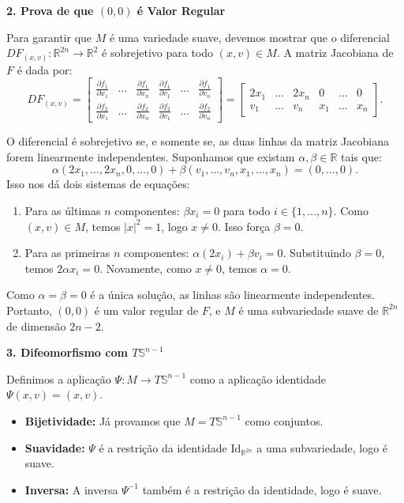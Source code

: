 {	\textbf{2. Prova de que $(0,0)$ é Valor Regular}
	
	Para garantir que $M$ é uma variedade suave, devemos mostrar que o diferencial $DF_{(x,v)} : \mathbb{R}^{2n} \to \mathbb{R}^2$ é sobrejetivo para todo $(x, v) \in M$. A matriz Jacobiana de $F$ é dada por:
	\begin{equation*}
		DF_{(x,v)} = \begin{bmatrix} 
			\frac{\partial f_1}{\partial x_1} & \dots & \frac{\partial f_1}{\partial x_n} & \frac{\partial f_1}{\partial v_1} & \dots & \frac{\partial f_1}{\partial v_n} \\
			\frac{\partial f_2}{\partial x_1} & \dots & \frac{\partial f_2}{\partial x_n} & \frac{\partial f_2}{\partial v_1} & \dots & \frac{\partial f_2}{\partial v_n}
		\end{bmatrix} = \begin{bmatrix} 
			2x_1 & \dots & 2x_n & 0 & \dots & 0 \\
			v_1 & \dots & v_n & x_1 & \dots & x_n
		\end{bmatrix}.
	\end{equation*}
	
	O diferencial é sobrejetivo se, e somente se, as duas linhas da matriz Jacobiana forem linearmente independentes. Suponhamos que existam $\alpha, \beta \in \mathbb{R}$ tais que:
	\begin{equation*}
		\alpha (2x_1, \dots, 2x_n, 0, \dots, 0) + \beta (v_1, \dots, v_n, x_1, \dots, x_n) = (0, \dots, 0).
	\end{equation*}
	Isso nos dá dois sistemas de equações:
	\begin{enumerate}
		\item Para as últimas $n$ componentes: $\beta x_i = 0$ para todo $i \in \{1, \dots, n\}$. Como $(x, v) \in M$, temos $|x|^2 = 1$, logo $x \neq 0$. Isso força $\beta = 0$.
		\item Para as primeiras $n$ componentes: $\alpha (2x_i) + \beta v_i = 0$. Substituindo $\beta = 0$, temos $2\alpha x_i = 0$. Novamente, como $x \neq 0$, temos $\alpha = 0$.
	\end{enumerate}
	Como $\alpha = \beta = 0$ é a única solução, as linhas são linearmente independentes. Portanto, $(0,0)$ é um valor regular de $F$, e $M$ é uma subvariedade suave de $\mathbb{R}^{2n}$ de dimensão $2n - 2$.
	
	\textbf{3. Difeomorfismo com $T\mathbb{S}^{n-1}$}
	
	Definimos a aplicação $\Psi : M \to T\mathbb{S}^{n-1}$ como a aplicação identidade $\Psi(x, v) = (x, v)$.
	\begin{itemize}
		\item \textbf{Bijetividade:} Já provamos que $M = T\mathbb{S}^{n-1}$ como conjuntos.
		\item \textbf{Suavidade:} $\Psi$ é a restrição da identidade $\text{Id}_{\mathbb{R}^{2n}}$ a uma subvariedade, logo é suave.
		\item \textbf{Inversa:} A inversa $\Psi^{-1}$ também é a restrição da identidade, logo é suave.
	\end{itemize}
	
}
